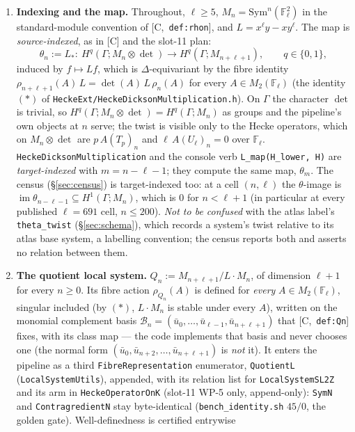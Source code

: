 \documentclass[11pt]{article}
\theoremstyle{remark}
\newcommand{\F}{\mathbb{F}}
\newcommand{\Sym}{\mathrm{Sym}}
\newcommand{\Ga}{\Gamma}
\newcommand{\De}{\Delta}
\newcommand{\Fl}{\F_\ell}
\DeclareMathOperator{\im}{im}
\newcommand{\Mn}{M_n}
\newcommand{\HA}[1]{[C,~\texttt{#1}]}      %
\begin{document}
\begin{enumerate}[label=(\alph*)]
\item \textbf{Indexing and the map.} Throughout, $\ell\ge5$, $\Mn=\Sym^n(\Fl^2)$ in the
  standard-module convention of \HA{def:rhon}, and $L=x^\ell y-xy^\ell$. The map is
  \emph{source-indexed}, as in [C] and the slot-11 plan:
  \[
    \theta_n:=L_\ast:\ H^q(\Ga;\Mn\otimes\det)\longrightarrow H^q(\Ga;M_{n+\ell+1}),\qquad q\in\{0,1\},
  \]
  induced by $f\mapsto Lf$, which is $\De$-equivariant by the fibre identity
  $\rho_{n+\ell+1}(A)\,L=\det(A)\,L\,\rho_n(A)$ for every $A\in M_2(\Fl)$ (the identity~$(\ast)$
  of \texttt{HeckeExt/HeckeDicksonMultiplication.h}). On $\Ga$ the character $\det$ is trivial, so
  $H^q(\Ga;\Mn\otimes\det)=H^q(\Ga;\Mn)$ as groups and the pipeline's own objects at $n$ serve;
  the twist is visible only to the Hecke operators, which on $\Mn\otimes\det$ are $p\,A(T_p)_n$ and
  $\ell\,A(U_\ell)_n=0$ over $\Fl$. \texttt{HeckeDicksonMultiplication} and the console verb
  \texttt{L\_map(H\_lower, H)} are \emph{target-indexed} with $m=n-\ell-1$; they compute the same
  map, $\theta_m$. The census (\S\ref{sec:census}) is target-indexed too: at a cell $(n,\ell)$ the
  $\theta$-image is $\im\theta_{n-\ell-1}\subseteq H^1(\Ga;\Mn)$, which is $0$ for $n<\ell+1$ (in
  particular at every published $\ell=691$ cell, $n\le200$). \emph{Not to be confused} with the
  atlas label's \texttt{theta\_twist} (\S\ref{sec:schema}), which records a system's twist relative
  to its atlas base system, a labelling convention; the census reports both and asserts no
  relation between them.
\item \textbf{The quotient local system.} $Q_n:=M_{n+\ell+1}/L\cdot\Mn$, of dimension $\ell+1$ for
  every $n\ge0$. Its fibre action $\rho_{Q_n}(A)$ is defined for \emph{every}
  $A\in M_2(\Fl)$, singular included (by $(\ast)$, $L\cdot\Mn$ is stable under every $A$), written
  on the monomial complement basis $\mathcal B_n=(\bar u_0,\dots,\bar u_{\ell-1},\bar u_{n+\ell+1})$
  that \HA{def:Qn} fixes, with its class map --- the code implements that basis and never chooses
  one (the normal form $(\bar u_0,\bar u_{n+2},\dots,\bar u_{n+\ell+1})$ is \emph{not} it). It enters the pipeline as a third \texttt{FibreRepresentation} enumerator,
  \texttt{QuotientL} (\texttt{LocalSystemUtils}), appended, with its relation list for
  \texttt{LocalSystemSL2Z} and its arm in \texttt{HeckeOperatorOnK} (slot-11 WP-5 only,
  append-only): \texttt{SymN} and \texttt{ContragredientN} stay byte-identical
  (\texttt{bench\_identity.sh} $45/0$, the golden gate). Well-definedness is certified entrywise

\end{enumerate}
\end{document}
